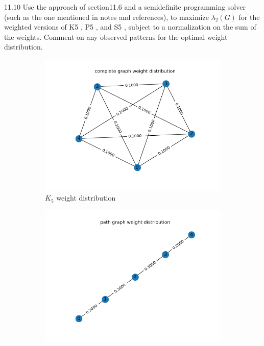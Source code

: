\documentclass{article}
\begin{document}
\begin{problem}
    11.10 Use the approach of section11.6 and a semideﬁnite programming
    solver (such as the one mentioned in notes and references), to maximize
    $\lambda_2 (G)$ for the weighted versions of K5 , P5 , and S5 , subject to a normalization on the sum of the weights. Comment on any observed patterns for the
    optimal weight distribution.
    \begin{figure}[!h]
        \centering
        \begin{subfigure}{0.45\textwidth}
            \includegraphics[width=\textwidth]{./img/p5_complete.png}
            \caption{$K_5$ weight distribution}
        \end{subfigure}
        \begin{subfigure}{0.45\textwidth}
            \includegraphics[width=\textwidth]{./img/p5_path.png}

\end{subfigure}
\end{figure}
\end{problem}
\end{document}
